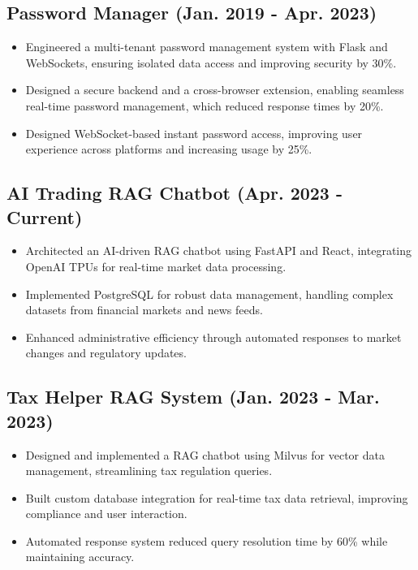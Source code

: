 \documentclass[a4paper,9pt]{article}
\begin{document}
\subsection*{Password Manager (Jan. 2019 - Apr. 2023)}
\begin{itemize}
    \item Engineered a multi-tenant password management system with Flask and WebSockets, ensuring isolated data access and improving security by 30\%.
    \item Designed a secure backend and a cross-browser extension, enabling seamless real-time password management, which reduced response times by 20\%.
    \item Designed WebSocket-based instant password access, improving user experience across platforms and increasing usage by 25\%.
\end{itemize}

\subsection*{AI Trading RAG Chatbot (Apr. 2023 - Current)}
\begin{itemize}
    \item Architected an AI-driven RAG chatbot using FastAPI and React, integrating OpenAI TPUs for real-time market data processing.
    \item Implemented PostgreSQL for robust data management, handling complex datasets from financial markets and news feeds.
    \item Enhanced administrative efficiency through automated responses to market changes and regulatory updates.
\end{itemize}

\subsection*{Tax Helper RAG System (Jan. 2023 - Mar. 2023)}
\begin{itemize}
    \item Designed and implemented a RAG chatbot using Milvus for vector data management, streamlining tax regulation queries.
    \item Built custom database integration for real-time tax data retrieval, improving compliance and user interaction.
    \item Automated response system reduced query resolution time by 60\% while maintaining accuracy.
\end{itemize}
\end{document}

